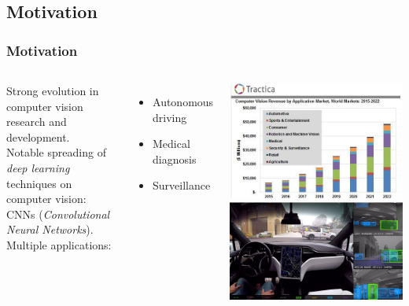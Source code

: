 \documentclass[11pt]{beamer}
\begin{document}
\subsection{Motivation}
\begin{frame}[allowframebreaks]
	\frametitle{Motivation}
		\begin{columns}
			Strong evolution in computer vision research and development.\\
			\vspace{0.2cm}
			Notable spreading of \textit{deep learning} techniques on computer vision: CNNs (\textit{Convolutional Neural Networks}).\\
			\vspace{0.8cm}			
			Multiple applications:
			\begin{itemize}
				\item Autonomous driving
				\item Medical diagnosis
				\item Surveillance
			\end{itemize}
			\includegraphics[width=\linewidth]{cv_forecast_2022} \\
			\vspace{0.5cm}
			\includegraphics[width=\linewidth]{tesla_autonomous_driving}
		\end{columns}



\end{frame}
\end{document}
